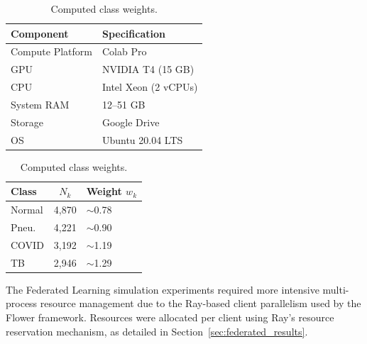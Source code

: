 {\renewcommand{\arraystretch}{1.2}
\begin{table}[htbp]
    \centering
    \begin{minipage}[c]{0.52\textwidth}
        \centering
        \caption{Hardware specifications.}
        \label{tab:chest_hardware}
        \small
        \begin{tabularx}{\textwidth}{|l|X|}
            \hline
            \textbf{Component} & \textbf{Specification} \\
            \hline
            Compute Platform & Colab Pro \\
            \hline
            GPU & NVIDIA T4 (15 GB) \\
            \hline
            CPU & Intel Xeon (2 vCPUs) \\
            \hline
            System RAM & 12--51 GB \\
            \hline
            Storage & Google Drive \\
            \hline
            OS & Ubuntu 20.04 LTS \\
            \hline
        \end{tabularx}
    \end{minipage}
    \hfill
    \begin{minipage}[c]{0.44\textwidth}
        \centering
        \caption{Computed class weights.}
        \label{tab:chest_computed_weights}
        \small
        \begin{tabularx}{\textwidth}{|l|c|X|}
            \hline
            \textbf{Class} & $N_k$ & \textbf{Weight $w_k$} \\
            \hline
            Normal & 4,870 & $\sim$0.78 \\
            \hline
            Pneu. & 4,221 & $\sim$0.90 \\
            \hline
            COVID & 3,192 & $\sim$1.19 \\
            \hline
            TB & 2,946 & $\sim$1.29 \\
            \hline
        \end{tabularx}
    \end{minipage}
\end{table}
}

The Federated Learning simulation experiments required more intensive multi-process resource management due to the Ray-based client parallelism used by the Flower framework. Resources were allocated per client using Ray's resource reservation mechanism, as detailed in Section~\ref{sec:federated_results}.

